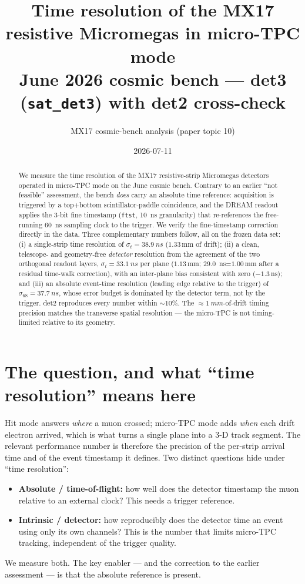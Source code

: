 \documentclass[11pt]{article}
\title{\vspace{-1.5em}Time resolution of the MX17 resistive Micromegas in micro-TPC mode\\
\large June 2026 cosmic bench --- det3 (\texttt{sat\_det3}) with det2 cross-check}
\author{MX17 cosmic-bench analysis (paper topic 10)}
\date{2026-07-11}
\newcommand{\ns}{\,\mathrm{ns}}
\newcommand{\dmm}{\,\mathrm{mm}}
\begin{document}
\maketitle
\vspace{-1.5em}

\begin{abstract}
\noindent We measure the time resolution of the MX17 resistive-strip Micromegas
detectors operated in micro-TPC mode on the June cosmic bench. Contrary to an
earlier ``not feasible'' assessment, the bench \emph{does} carry an absolute time
reference: acquisition is triggered by a top+bottom scintillator-paddle
coincidence, and the DREAM readout applies the 3-bit fine timestamp
(\texttt{ftst}, \SI{10}{ns} granularity) that re-references the free-running
\SI{60}{ns} sampling clock to the trigger. We verify the fine-timestamp
correction directly in the data. Three complementary numbers follow, all on the
frozen data set: (i) a single-strip time resolution of
$\sigma_t=\SI{38.9}{ns}$ ($1.33\dmm$ of drift); (ii) a clean, telescope- and
geometry-free \emph{detector} resolution from the agreement of the two orthogonal
readout layers, $\sigma_t=\SI{33.1}{ns}$ per plane ($1.13\dmm$;
\SI{29.0}{ns}=$1.00\dmm$ after a residual time-walk correction), with an
inter-plane bias consistent with zero ($-1.3\ns$); and (iii) an absolute
event-time resolution (leading edge relative to the trigger) of
$\sigma_{68}=\SI{37.7}{ns}$, whose error budget is dominated by the detector term,
not by the trigger. det2 reproduces every number within ${\sim}10\%$. The
$\approx\SI{1}{mm}$-of-drift timing precision matches the transverse spatial
resolution --- the micro-TPC is not timing-limited relative to its geometry.
\end{abstract}

\section{The question, and what ``time resolution'' means here}
Hit mode answers \emph{where} a muon crossed; micro-TPC mode adds \emph{when} each
drift electron arrived, which is what turns a single plane into a 3-D track
segment. The relevant performance number is therefore the precision of the
per-strip arrival time and of the event timestamp it defines. Two distinct
questions hide under ``time resolution'':
\begin{itemize}
  \item \textbf{Absolute / time-of-flight:} how well does the detector timestamp
        the muon relative to an external clock? This needs a trigger reference.
  \item \textbf{Intrinsic / detector:} how reproducibly does the detector time an
        event using only its own channels? This is the number that limits
        micro-TPC tracking, independent of the trigger quality.
\end{itemize}
We measure both. The key enabler --- and the correction to the earlier
assessment --- is that the absolute reference is present.
\end{document}

